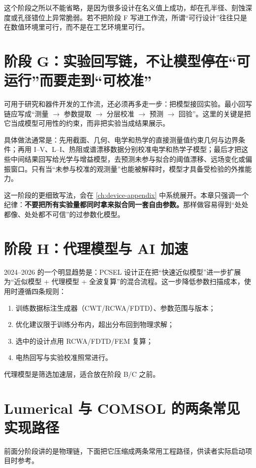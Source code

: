这个阶段之所以不能省略，是因为很多设计在名义值上成功，却在孔半径、刻蚀深度或孔径错位上异常脆弱。若不把阶段 F 写进工作流，所谓“可行设计”往往只是在数值环境里可行，而不是在工艺环境里可行。

\section{阶段 G：实验回写链，不让模型停在“可运行”而要走到“可校准”}
可用于研究和器件开发的工作流，还必须再多走一步：把模型接回实验。最小回写链应写成“测量 $\rightarrow$ 参数提取 $\rightarrow$ 分层校准 $\rightarrow$ 预测 $\rightarrow$ 回验”。这里的关键是把它当成模型可用性的约束，而非把实验当成结果展示。

具体做法通常是：先用截面、几何、电学和热学的直接测量值约束几何与边界条件；再用 I--V、L--I、热阻或谱漂移数据分别校准电学和热学子模型；最后才把这些中间结果回写给光学与增益模型，去预测未参与拟合的阈值漂移、远场变化或偏振窗口。只有当“未参与校准的观测量”也能被解释时，模型才具备受检验的外推能力。

这一阶段的更细致写法，会在 \cref{ch:device-appendix} 中系统展开。本章只强调一个纪律：\textbf{不要把所有实验量都同时拿来拟合同一套自由参数。}那样做容易得到“处处都像、处处都不可信”的过参数化模型。

\section{阶段 H：代理模型与 AI 加速}
2024--2026 的一个明显趋势是：PCSEL 设计正在把“快速近似模型”进一步扩展为“近似模型 + 代理模型 + 全波复算”的混合流程\cite{lang2025rapidpcseltools,qi2025postsurrogate,xu2024modifiedrcwa}。这一步降低参数扫描成本，使用时遵循四条规则：
\begin{enumerate}
  \item 训练数据标注生成器（CWT/RCWA/FDTD）、参数范围与版本；
  \item 优化建议限于训练分布内，超出分布回到物理求解；
  \item 选中的设计点用 RCWA/FDTD/FEM 复算；
  \item 电热回写与实验校准照常进行。
\end{enumerate}
代理模型是筛选加速层，适合放在阶段 B/C 之前。

\section{Lumerical 与 COMSOL 的两条常见实现路径}
前面分阶段讲的是物理链，下面把它压缩成两条常用工程路径，供读者实际启动项目时参考。

